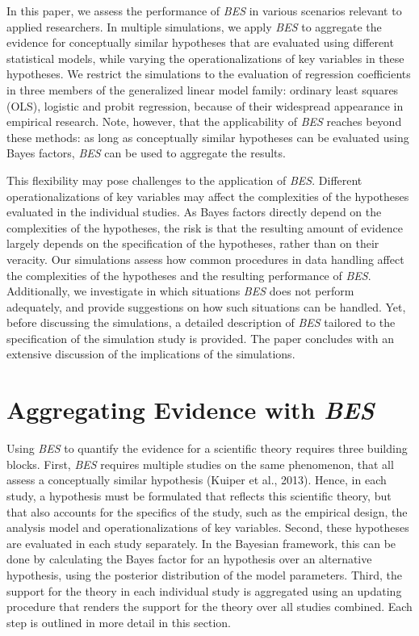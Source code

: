 \documentclass[
]{interact}
\begin{document}
In this paper, we assess the performance of \emph{BES} in various
scenarios relevant to applied researchers. In multiple simulations, we
apply \emph{BES} to aggregate the evidence for conceptually similar
hypotheses that are evaluated using different statistical models, while
varying the operationalizations of key variables in these hypotheses. We
restrict the simulations to the evaluation of regression coefficients in
three members of the generalized linear model family: ordinary least
squares (OLS), logistic and probit regression, because of their
widespread appearance in empirical research. Note, however, that the
applicability of \emph{BES} reaches beyond these methods: as long as
conceptually similar hypotheses can be evaluated using Bayes factors,
\emph{BES} can be used to aggregate the results.

This flexibility may pose challenges to the application of \emph{BES}.
Different operationalizations of key variables may affect the
complexities of the hypotheses evaluated in the individual studies. As
Bayes factors directly depend on the complexities of the hypotheses, the
risk is that the resulting amount of evidence largely depends on the
specification of the hypotheses, rather than on their veracity. Our
simulations assess how common procedures in data handling affect the
complexities of the hypotheses and the resulting performance of
\emph{BES}. Additionally, we investigate in which situations \emph{BES}
does not perform adequately, and provide suggestions on how such
situations can be handled. Yet, before discussing the simulations, a
detailed description of \emph{BES} tailored to the specification of the
simulation study is provided. The paper concludes with an extensive
discussion of the implications of the simulations.

\hypertarget{aggregating-evidence-with-bes}{%
\section{\texorpdfstring{Aggregating Evidence with
\emph{BES}}{Aggregating Evidence with BES}}\label{aggregating-evidence-with-bes}}

Using \emph{BES} to quantify the evidence for a scientific theory
requires three building blocks. First, \emph{BES} requires multiple
studies on the same phenomenon, that all assess a conceptually similar
hypothesis (Kuiper et al., 2013). Hence, in each study, a hypothesis
must be formulated that reflects this scientific theory, but that also
accounts for the specifics of the study, such as the empirical design,
the analysis model and operationalizations of key variables. Second,
these hypotheses are evaluated in each study separately. In the Bayesian
framework, this can be done by calculating the Bayes factor for an
hypothesis over an alternative hypothesis, using the posterior
distribution of the model parameters. Third, the support for the theory
in each individual study is aggregated using an updating procedure that
renders the support for the theory over all studies combined. Each step
is outlined in more detail in this section.
\end{document}
